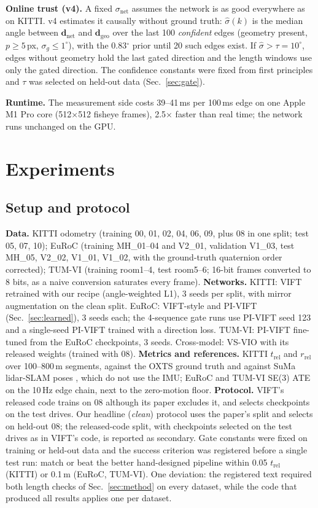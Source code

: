 \documentclass[letterpaper,journal]{IEEEtran}
\newcommand{\dnet}{\mathbf{d}_{\mathrm{net}}}
\newcommand{\dgeo}{\mathbf{d}_{\mathrm{geo}}}
\begin{document}
\textbf{Online trust (v4).} A fixed $\sigma_{\mathrm{net}}$ assumes the network is as good everywhere as on KITTI. v4 estimates it causally without ground truth: $\hat\sigma(k)$ is the median angle between $\dnet$ and $\dgeo$ over the last 100 \emph{confident} edges (geometry present, $p\ge5$\,px, $\sigma_g\le1^\circ$), with the 0.83$^\circ$ prior until 20 such edges exist. If $\hat\sigma>\tau=10^\circ$, edges without geometry hold the last gated direction and the length windows use only the gated direction. The confidence constants were fixed from first principles and $\tau$ was selected on held-out data (Sec.~\ref{sec:gate}).

\textbf{Runtime.} The measurement side costs 39--41\,ms per 100\,ms edge on one Apple M1 Pro core (512$\times$512 fisheye frames), 2.5$\times$ faster than real time; the network runs unchanged on the GPU.

\section{Experiments}

\subsection{Setup and protocol}
\textbf{Data.} KITTI odometry \cite{Geiger2012} (training 00, 01, 02, 04, 06, 09, plus 08 in one split; test 05, 07, 10); EuRoC \cite{Burri2016} (training MH\_01--04 and V2\_01, validation V1\_03, test MH\_05, V2\_02, V1\_01, V1\_02, with the ground-truth quaternion order corrected); TUM-VI \cite{Schubert2018} (training room1--4, test room5--6; 16-bit frames converted to 8 bits, as a naive conversion saturates every frame).
\textbf{Networks.} KITTI: VIFT retrained with our recipe (angle-weighted L1), 3 seeds per split, with mirror augmentation on the clean split. EuRoC: VIFT-style and PI-VIFT (Sec.~\ref{sec:learned}), 3 seeds each; the 4-sequence gate runs use PI-VIFT seed 123 and a single-seed PI-VIFT trained with a direction loss. TUM-VI: PI-VIFT fine-tuned from the EuRoC checkpoints, 3 seeds. Cross-model: VS-VIO \cite{Yang2022} with its released weights (trained with 08).
\textbf{Metrics and references.} KITTI $t_\mathrm{rel}$ and $r_\mathrm{rel}$ over 100--800\,m segments, against the OXTS ground truth and against SuMa lidar-SLAM poses \cite{Behley2018}, which do not use the IMU; EuRoC and TUM-VI SE(3) ATE on the 10\,Hz edge chain, next to the zero-motion floor.
\textbf{Protocol.} VIFT's released code trains on 08 although its paper excludes it, and selects checkpoints on the test drives. Our headline (\emph{clean}) protocol uses the paper's split and selects on held-out 08; the released-code split, with checkpoints selected on the test drives as in VIFT's code, is reported as secondary. Gate constants were fixed on training or held-out data and the success criterion was registered before a single test run: match or beat the better hand-designed pipeline within 0.05 $t_\mathrm{rel}$ (KITTI) or 0.1\,m (EuRoC, TUM-VI). One deviation: the registered text required both length checks of Sec.~\ref{sec:method} on every dataset, while the code that produced all results applies one per dataset.
\end{document}
